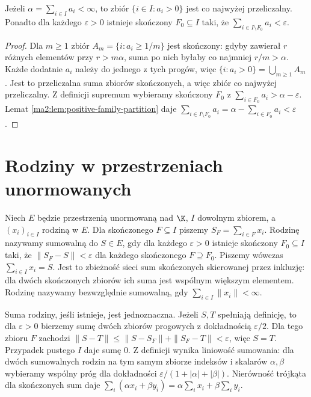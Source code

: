 \begin{twierdzenie}
\label{ma2:thm:positive-family-support}
Jeżeli $\alpha=\sum_{i\in I}a_i<\infty$, to zbiór
$\{i\in I:a_i>0\}$ jest co najwyżej przeliczalny.
Ponadto dla każdego $\varepsilon>0$ istnieje skończony
$F_0\subseteq I$ taki, że
$\sum_{i\in I\setminus F_0}a_i<\varepsilon$.
\end{twierdzenie}
\begin{proof}
Dla $m\ge1$ zbiór $A_m=\{i:a_i\ge1/m\}$ jest skończony:
gdyby zawierał $r$ różnych elementów przy $r>m\alpha$,
suma po nich byłaby co najmniej $r/m>\alpha$.
Każde dodatnie $a_i$ należy do jednego z tych progów,
więc $\{i:a_i>0\}=\bigcup_{m\ge1}A_m$.
Jest to przeliczalna suma zbiorów skończonych, a więc
zbiór co najwyżej przeliczalny.
Z definicji supremum wybieramy skończony $F_0$
z $\sum_{i\in F_0}a_i>\alpha-\varepsilon$.
Lemat \ref{ma2:lem:positive-family-partition} daje
$\sum_{i\in I\setminus F_0}a_i
=\alpha-\sum_{i\in F_0}a_i<\varepsilon$.
\end{proof}

\section{Rodziny w przestrzeniach unormowanych}

\begin{definicja}
\label{ma2:def:summable-family}
Niech $E$ będzie przestrzenią unormowaną nad $\K$,
$I$ dowolnym zbiorem, a $(x_i)_{i\in I}$ rodziną w $E$.
Dla skończonego $F\subseteq I$ piszemy
$S_F=\sum_{i\in F}x_i$. Rodzinę nazywamy sumowalną
do $S\in E$, gdy dla każdego $\varepsilon>0$ istnieje
skończony $F_0\subseteq I$ taki, że
$\|S_F-S\|<\varepsilon$ dla każdego skończonego
$F\supseteq F_0$. Piszemy wówczas $\sum_{i\in I}x_i=S$.
Jest to zbieżność sieci sum skończonych skierowanej
przez inkluzję: dla dwóch skończonych zbiorów ich suma
jest wspólnym większym elementem.
Rodzinę nazywamy bezwzględnie sumowalną, gdy
$\sum_{i\in I}\|x_i\|<\infty$.
\end{definicja}
Suma rodziny, jeśli istnieje, jest jednoznaczna.
Jeżeli $S,T$ spełniają definicję, to dla $\varepsilon>0$
bierzemy sumę dwóch zbiorów progowych z dokładnością
$\varepsilon/2$. Dla tego zbioru $F$ zachodzi
$\|S-T\|\le\|S-S_F\|+\|S_F-T\|<\varepsilon$, więc $S=T$.
Przypadek pustego $I$ daje sumę $0$.
Z definicji wynika liniowość sumowania: dla dwóch
sumowalnych rodzin na tym samym zbiorze indeksów
i skalarów $\alpha,\beta$ wybieramy wspólny próg
dla dokładności $\varepsilon/(1+|\alpha|+|\beta|)$.
Nierówność trójkąta dla skończonych sum daje
$\sum_i(\alpha x_i+\beta y_i)=\alpha\sum_i x_i+\beta\sum_i y_i$.

